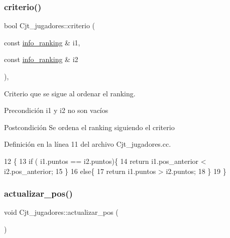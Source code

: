 \subsubsection{\texorpdfstring{criterio()}{criterio()}}
{\footnotesize\ttfamily bool Cjt\+\_\+jugadores\+::criterio (\begin{DoxyParamCaption}\item[{const \hyperlink{struct_cjt__jugadores_1_1info__ranking}{info\+\_\+ranking} \&}]{i1,  }\item[{const \hyperlink{struct_cjt__jugadores_1_1info__ranking}{info\+\_\+ranking} \&}]{i2 }\end{DoxyParamCaption})\hspace{0.3cm}{\ttfamily [static]}, {\ttfamily [private]}}



Criterio que se sigue al ordenar el ranking. 

\begin{DoxyPrecond}{Precondición}
i1 y i2 no son vacíos 
\end{DoxyPrecond}
\begin{DoxyPostcond}{Postcondición}
Se ordena el ranking siguiendo el criterio 
\end{DoxyPostcond}


Definición en la línea 11 del archivo Cjt\+\_\+jugadores.\+cc.


\begin{DoxyCode}
12 \{
13   \textcolor{keywordflow}{if} ( i1.puntos == i2.puntos)\{
14     \textcolor{keywordflow}{return} i1.pos\_anterior < i2.pos\_anterior;
15   \}
16   \textcolor{keywordflow}{else}\{
17     \textcolor{keywordflow}{return} i1.puntos > i2.puntos;
18   \}
19 \}
\end{DoxyCode}
\mbox{\label{class_cjt__jugadores_ac221d0fd27654e48e2c27560562a7d5a}} 
\subsubsection{\texorpdfstring{actualizar\+\_\+pos()}{actualizar\_pos()}}
{\footnotesize\ttfamily void Cjt\+\_\+jugadores\+::actualizar\+\_\+pos (\begin{DoxyParamCaption}{ }\end{DoxyParamCaption})\hspace{0.3cm}{\ttfamily [private]}}



